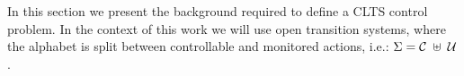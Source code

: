 In this section we present the background required to define a CLTS control problem.  In the context of this work we will use open transition systems, where the alphabet is split between controllable and monitored actions, i.e.: $\Sigma=\mathcal{C} \; \uplus \;\mathcal{U}$.



